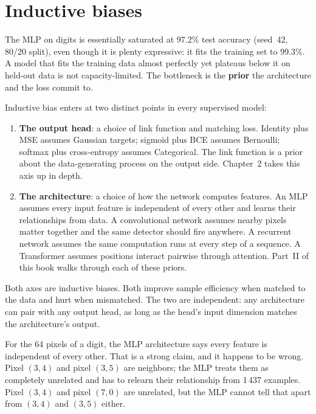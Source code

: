 
\section{Inductive biases}\label{sec:inductive-biases}

The MLP on digits is essentially saturated at 97.2\% test accuracy
(seed~42, 80/20 split), even though it is plenty expressive: it fits the
training set to 99.3\%. A model that fits the training data almost
perfectly yet plateaus below it on held-out data is not
capacity-limited. The bottleneck is the \textbf{prior} the architecture
and the loss commit to.

Inductive bias enters at two distinct points in every supervised model:

\begin{enumerate}
\item \textbf{The output head}: a choice of link function and matching
  loss. Identity plus MSE assumes Gaussian targets; sigmoid plus BCE
  assumes Bernoulli; softmax plus cross-entropy assumes Categorical. The
  link function is a prior about the data-generating process on the
  output side. Chapter~2 takes this axis up in depth.
\item \textbf{The architecture}: a choice of how the network computes
  features. An MLP assumes every input feature is independent of every
  other and learns their relationships from data. A convolutional network
  assumes nearby pixels matter together and the same detector should fire
  anywhere. A recurrent network assumes the same computation runs at every
  step of a sequence. A Transformer assumes positions interact pairwise
  through attention. Part~II of this book walks through each of these
  priors.
\end{enumerate}

Both axes are inductive biases. Both improve sample efficiency when
matched to the data and hurt when mismatched. The two are independent:
any architecture can pair with any output head, as long as the head's
input dimension matches the architecture's output.

For the 64 pixels of a digit, the MLP architecture says every feature
is independent of every other. That is a strong claim, and it happens to
be wrong. Pixel $(3, 4)$ and pixel $(3, 5)$ are neighbors; the MLP
treats them as completely unrelated and has to relearn their
relationship from 1\,437 examples. Pixel $(3, 4)$ and pixel $(7, 0)$
are unrelated, but the MLP cannot tell that apart from $(3, 4)$ and
$(3, 5)$ either.

